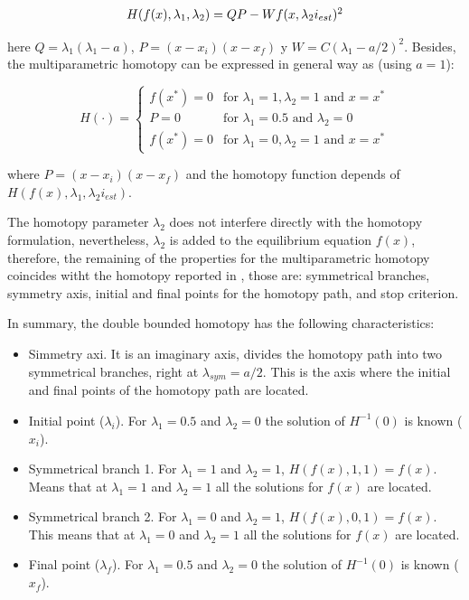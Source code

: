 \documentclass[conference,letterpaper,twocolumn]{IEEEtran}
\begin{document}
\begin{equation}
{\small
\begin{array}{l}
H(f(x),\lambda_1, \lambda_2 )=QP - Wf(x,\lambda_2i_{est})^2
\end{array}}
\label{homotopiaPx3}
\end{equation}

here $Q=\lambda_1(\lambda_1-a)$, $P=(x-x_i)(x-x_f)$ y $W=C(\lambda_1-a/2)^2$. Besides, the
multiparametric homotopy can be expressed in general way as (using $a=1$):

{\small
\begin{displaymath}
{H}(\cdot)= \left\{\begin{array}{rl}
f(x^*)=0 & \textrm{for  $\lambda_1=1, \lambda_2=1$ and $x=x^*$}\\
P=0 & \textrm{for $\lambda_1=0.5$ and $\lambda_2=0$}\\
f(x^*)=0 & \textrm{for $\lambda_1=0, \lambda_2=1$ and $x=x^*$}
\end{array}\right.
\end{displaymath}
}

where $P=(x-x_i)(x-x_f)$ and the homotopy function depends of ${H}({f}({x}),\lambda_1,\lambda_2{i_{est}})$.

The homotopy parameter $\lambda_2$ does not interfere directly with the homotopy formulation, nevertheless, $\lambda_2$ is added to the equilibrium equation $f(x)$, therefore, the remaining of the properties for the multiparametric homotopy coincides witht the homotopy reported in \cite{xxx1}, those are: symmetrical branches, symmetry axis, initial and final points for the homotopy path, and stop criterion.

In summary, the double bounded homotopy has the following characteristics:

\begin{itemize}
\item Simmetry axi. It is an imaginary axis, divides the homotopy path into two symmetrical branches, right at $\lambda_{sym}=a/2$. This is the axis where the initial and final points of the homotopy path are located.
\item Initial point ($\lambda_i$). For $\lambda_1=0.5$ and $\lambda_2=0$ the solution of $H^{-1}(0)$ is known ($x_i$). 
\item Symmetrical branch 1. For $\lambda_1=1$ and $\lambda_2=1$, ${H}({f}({x}),1,1)={f}({x})$. Means that at $\lambda_1=1$ and $\lambda_2=1$ all the solutions for ${f}({x})$ are located.
\item Symmetrical branch 2. For $\lambda_1=0$ and $\lambda_2=1$, ${H}({f}({x}),0,1 )={f}({x})$. This means that at $\lambda_1=0$ and $\lambda_2=1$ all the solutions for ${f}({x})$ are located.
\item Final point  ($\lambda_f$). For $\lambda_1=0.5$ and $\lambda_2=0$ the solution of $H^{-1}(0)$ is known ($x_f$). 
\end{itemize}
\end{document}
